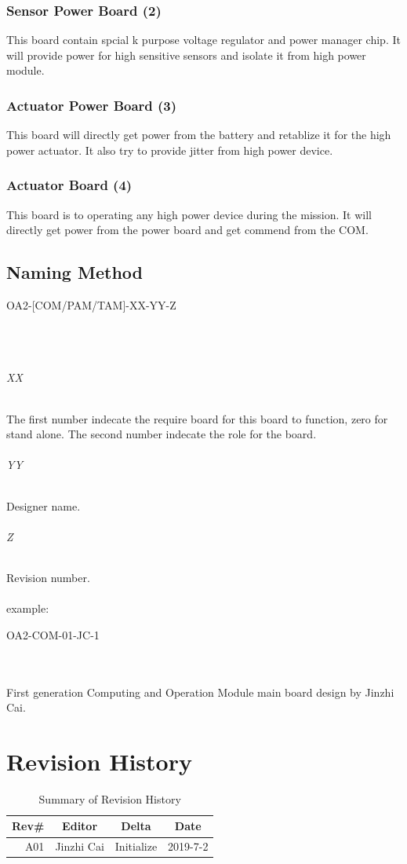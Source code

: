 \documentclass[12pt,article]{memoir}
\begin{document}
\subsection{Sensor Power Board (2)}
This board contain spcial k purpose voltage regulator and power manager chip. It will provide power for high sensitive sensors and isolate it from high power module.
\subsection{Actuator Power Board (3)}
This board will directly get power from the battery and retablize it for the high power actuator. It also try to provide jitter from high power device.
\subsection{Actuator Board (4)}
This board is to operating any high power device during the mission. It will directly get power from the power board and get commend from the COM.
\newpage
\section{Naming Method}
\begin{LARGE}
OA2-[COM/PAM/TAM]-XX-YY-Z
\end{LARGE}\\\\
\subparagraph{XX}
The first number indecate the require board for this board to function, zero for stand alone. The second number indecate the role for the board.
\subparagraph{YY}
Designer name.
\subparagraph{Z}
Revision number.\\\\
example: 
\begin{large}
OA2-COM-01-JC-1
\end{large}\\\\
First generation Computing and Operation Module main board design by Jinzhi Cai.
\newpage
\chapter{Revision History}
\begin{table}[H]
	\centering
	\begin{tabu}{r || c | c | c }
		Rev\# & Editor & Delta & Date\\ \hline
		A01 & Jinzhi Cai & Initialize  & 2019-7-2\\ \hline
	\end{tabu}
	\caption{Summary of Revision History}
	\label{tab:edatools}
\end{table}
\end{document}
